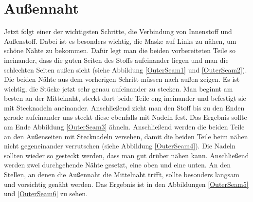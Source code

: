 \documentclass[12pt,parskip=full]{scrartcl}
\begin{document}
\section{Außennaht}
Jetzt folgt einer der wichtigsten Schritte, die Verbindung von Innenstoff und Außenstoff. Dabei ist es besonders wichtig, die Maske auf Links zu nähen, um schöne Nähte zu bekommen. Dafür legt man die beiden vorbereiteten Teile so ineinander, dass die guten Seiten des Stoffs aufeinander liegen und man die schlechten Seiten außen sieht (siehe Abbildung \ref{OuterSeam1} und \ref{OuterSeam2}). Die beiden Nähte aus dem vorherigen Schritt müssen nach außen zeigen. Es ist wichtig, die Stücke jetzt sehr genau aufeinander zu stecken. Man beginnt am besten an der Mittelnaht, steckt dort beide Teile eng ineinander und befestigt sie mit Stecknadeln aneinander. Anschließend zieht man den Stoff bis zu den Enden gerade aufeinander uns steckt diese ebenfalls mit Nadeln fest. Das Ergebnis sollte am Ende Abbildung \ref{OuterSeam3} ähneln. Anschließend werden die beiden Teile an den Außenseiten mit Stecknadeln versehen, damit die beiden Teile beim nähen nicht gegeneinander verrutschen (siehe Abbildung \ref{OuterSeam4}). Die Nadeln sollten wieder so gesteckt werden, dass man gut drüber nähen kann. Anschließend werden zwei durchgehende Nähte gesetzt, eine oben und eine unten. An den Stellen, an denen die Außennaht die Mittelnaht trifft, sollte besonders langsam und vorsichtig genäht werden. Das Ergebnis ist in den Abbildungen \ref{OuterSeam5} und \ref{OuterSeam6} zu sehen.
\end{document}
